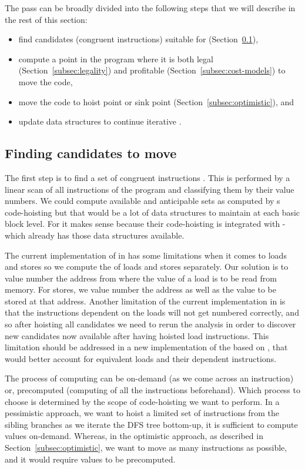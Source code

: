\documentclass[acmlarge,review,anonymous]{acmart}\settopmatter{printfolios=true}
\begin{document}
The \GCM{} pass can be broadly divided into the following steps that we will
describe in the rest of this section:
\begin{itemize}
\item find candidates (congruent instructions) suitable for \gcm{} (Section~\ref{subsec:finding-candidates}),
\item compute a point in the program where it is both legal
  (Section~\ref{subsec:legality}) and profitable
  (Section~\ref{subsec:cost-models}) to move the code,
\item move the code to hoist point or sink point
  (Section~\ref{subsec:optimistic}), and
\item update data structures to continue iterative \gcm{}.
\end{itemize}

\subsection{Finding candidates to move}
\label{subsec:finding-candidates}
The first step is to find a set of congruent instructions
\cite{briggs1997}. This is performed by a linear scan of all instructions of the
program and classifying them by their value numbers. We could compute available
and anticipable sets as computed by s code-hoisting but that would be a lot
of data structures to maintain at each basic block level. For \GCC{} it makes sense
because their code-hoisting is integrated with \GVN{}-\PRE{} which already has those
data structures available.

The current implementation of \GVN{} in \LLVM{} has some limitations when it
comes to loads and stores so we compute the \GVN{} of loads and stores
separately.  Our solution is to value number the address from where the value of
a load is to be read from memory. For stores, we value number the address as
well as the value to be stored at that address. Another limitation of the
current \GVN{} implementation in \LLVM{} is that the instructions dependent on
the loads will not get numbered correctly, and so after hoisting all candidates
we need to rerun the \GVN{} analysis in order to discover new candidates now
available after having hoisted load instructions.  This limitation should be
addressed in a new implementation of the \GVN{} based on \MemorySSA{}, that
would better account for equivalent loads and their dependent instructions.

The process of computing \GVN{} can be on-demand (as we come across an
instruction) or, precomputed (computing \GVN{} of all the instructions
beforehand). Which process to choose is determined by the scope of code-hoisting
we want to perform. In a pessimistic approach, we want to hoist a limited set of
instructions from the sibling branches as we iterate the DFS tree bottom-up, it
is sufficient to compute \GVN{} values on-demand. Whereas, in the optimistic
approach, as described in Section~\ref{subsec:optimistic}, we want to move as
many instructions as possible, and it would require \GVN{} values to be
precomputed.
\end{document}
